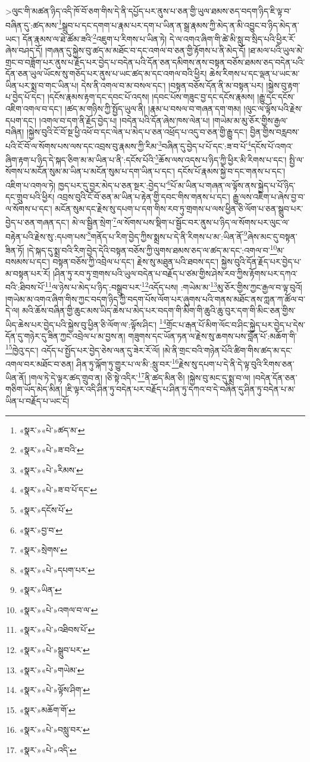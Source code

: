  >ལུང་གི་མཚན་ཉིད་འདི་ཁོ་བོ་ཅག་གིས་དེ་ནི་དཔྱོད་པར་ནུས་པ་ཅན་གྱི་ཡུལ་ཐམས་ཅད་བདག་ཉིད་ཇི་ལྟ་བ་བཞིན་དུ་:ཚད་མས་\footnote{«སྣར་»«པེ་»ཚད་མ་}སྒྲུབ་པ་དང་དགག་པ་རྣམ་པར་དག་པ་ཡིན་ན་སྒྲ་རྣམས་ཀྱི་མེད་ན་མི་འབྱུང་བ་ཉིད་མེད་ན་ཡང་། དོན་རྣམས་ལ་ཐེ་ཚོམ་ཟའི་\footnote{«སྣར་»«པེ་»ཟ་བའི་}འཇུག་པ་རིགས་པ་ཡིན་ཏེ། དེ་ལ་འགའ་ཞིག་གི་ཚེ་མི་སླུ་བ་སྲིད་པའི་ཕྱིར་རོ་ཞེས་བཤད་དོ། །གཞན་དུ་སྐྱེས་བུ་ཚད་མ་མཐོང་བ་དང་འགལ་བ་ཅན་གྱི་རྟོགས་པ་ནི་མེད་དོ། །ཐ་མལ་པའི་ཡུལ་མེ་གྲང་བ་བཟློག་པར་ནུས་པ་རྗོད་པར་བྱེད་པ་བདེན་པའི་དོན་ཅན་དམིགས་ནས་བསྟན་བཅོས་ཐམས་ཅད་བདེན་པའི་དོན་ཅན་ཡུལ་ཡོངས་སུ་གཅོད་པར་ནུས་པ་ཡང་ཚད་མ་དང་འགལ་བའི་ཕྱིར། ཆེས་རིགས་པ་དང་ལྡན་པ་ཡང་མ་ཡིན་པར་སྨྲ་བ་གང་ཡིན་པ། དེས་ནི་འགལ་བ་མ་བསལ་དང་། །བསྟན་བཅོས་དོན་ནི་མ་བསྟན་པར། །སྐྱེས་བུ་རྟག་པ་བྱེད་པོ་དང་། །དངོས་རྣམས་རྟག་དང་དབང་པོ་འདས། །དབང་པོས་གཟུང་བྱ་དང་དངོས་རྣམས། །རྒྱུ་དང་དངོས་འཇིག་འགལ་བ་དང་། །ཚད་མ་གཉིས་ཀྱི་སྤྱོད་ཡུལ་ནི། །རྣམ་པ་བསལ་བ་གཞན་དག་གམ། །ལུང་ལ་ལྟོས་པའི་རྗེས་དཔག་དང་། །འགལ་བ་དག་ནི་རྗོད་བྱེད་པ། །བདེན་པའི་དོན་ཞེས་ཁས་ལེན་པ། །གཡེམ་མ་མུ་ཅོར་གྱིས་རྒྱལ་བཞིན། །སྐྱེས་བུའི་ངོ་བོ་སྔ་ཕྱི་འཕོ་བ་དང་ལེན་པ་མེད་པ་ཅན་འཕྲོད་པ་འདུ་བ་ཅན་གྱི་རྒྱུ་དང་། བྱིན་གྱིས་བརླབས་པའི་ངོ་བོ་ལ་སོགས་པས་ལས་དང་འབྲས་བུ་རྣམས་ཀྱི་རིམ་\footnote{«སྣར་»«པེ་»རིམས་}བཞིན་དུ་བྱེད་པ་པོ་དང་:ཟ་བ་པོ་\footnote{«སྣར་»«པེ་»ཟ་བ་པོ་དང་}དངོས་པོ་འགའ་ཞིག་རྟག་པ་ཉིད་དེ་སྐད་ཅིག་མ་མ་ཡིན་པ་ནི་:དངོས་པོའི་\footnote{«སྣར་»དངོས་པོ་}ཆོས་ལས་འདས་པ་ཉིད་ཀྱི་ཕྱིར་མི་རིགས་པ་དང་། སྤྱི་ལ་སོགས་པ་མངོན་སུམ་མ་ཡིན་པ་མངོན་སུམ་པ་དག་ཡིན་པ་དང་། དངོས་པོ་རྣམས་སྐྱེ་བ་དང་གནས་པ་དང་། འཇིག་པ་འགལ་ཏེ། ཁྱད་པར་དུ་བྱར་མེད་པ་ཅན་སྔར་:བྱེད་པ་\footnote{«སྣར་»བྱ་བ་}པོ་མ་ཡིན་པ་གཞན་ལ་ལྟོས་ནས་སྐྱེད་པ་པོ་ཉིད་དང་གྲུབ་པའི་ཕྱིར། འབྲས་བུའི་ངོ་བོ་ཅན་མ་ཡིན་པ་རྟེན་གྱི་དབང་གིས་གནས་པ་དང་། རྒྱུ་ལས་འཇིག་པ་ཞེས་བྱ་བ་ལ་སོགས་པ་དང་། མངོན་སུམ་དང་རྗེས་སུ་དཔག་པ་དག་གིས་རབ་ཏུ་གྲགས་པ་ལས་ཕྱིན་ཅི་ལོག་པ་ཅན་སྒྲུབ་པར་བྱེད་པ་ཅན་གཞན་དང་། མེ་ལ་སྦྱིན་སྲེག་\footnote{«སྣར་»སྲེགས་}ལ་སོགས་པས་སྡིག་པ་སྦྱོང་བར་ནུས་པ་ཉིད་ལ་སོགས་པར་ལུང་ལ་བརྟེན་པའི་རྗེས་སུ་:དཔག་པས་\footnote{«སྣར་»«པེ་»དཔག་པར་}གནོད་པ་རིག་བྱེད་ཀྱིས་སྨྲས་པ་དེ་ནི་རིགས་པ་མ་:ཡིན་ནོ་\footnote{«སྣར་»ཡིན་}ཞེས་མང་དུ་བསྟན་ཟིན་ཏོ། །དེ་སྐད་དུ་སྨྲ་བའི་རིག་བྱེད་དེའི་བསྟན་བཅོས་ཀྱི་ལུགས་ཐམས་ཅད་ལ་ཚད་མ་དང་:འགལ་བ་\footnote{«སྣར་»«པེ་»འགལ་བ་ལ་}མ་བསམས་པ་དང་། བསྟན་བཅོས་ཀྱི་འབྲེལ་པ་དང་། རྗེས་སུ་མཐུན་པའི་ཐབས་དང་། སྐྱེས་བུའི་དོན་རྗོད་པར་བྱེད་པ་མ་བསྟན་པར་རོ། །ཤིན་ཏུ་རབ་ཏུ་གྲགས་པའི་ཡུལ་བདེན་པ་བརྗོད་པ་ཙམ་གྱིས་ཤེས་རབ་ཀྱིས་རྟོགས་པར་དཀའ་བའི་:ཐིབས་པོ་\footnote{«སྣར་»«པེ་»འཐིབས་པོ་}ལ་ཉེས་པ་མེད་པ་ཉིད་:བསྒྲུབ་པར་\footnote{«སྣར་»«པེ་»སྒྲུབ་པར་}འདོད་པས། :གཡེམ་མ་\footnote{«སྣར་»«པེ་»གཡེམ་}མུ་ཅོར་གྱིས་ཀྱང་རྒྱལ་བ་ལྟ་བུའོ། །གཡེམ་མ་འགའ་ཞིག་གིས་ཀྱང་བདག་ཉིད་ཀྱི་བདག་པོས་ལོག་པར་ཞུགས་པའི་གནས་མཐོང་ནས་ཀླན་ཀ་ཚོལ་བ་དེ་ལ། མའི་ཆོས་བཞིན་གྱི་ཆུང་མས་ཡིད་ཆེས་པ་མེད་པར་བདག་གི་མིག་གི་ཆུའི་ཆུ་བུར་དག་གི་མིང་ཅན་གྱིས་ཡིད་ཆེས་པར་བྱེད་པའི་སྐྱེས་བུ་ཕྱིན་ཅི་ལོག་ལ་:ལྟོས་ཤིང་། \footnote{«སྣར་»«པེ་»ལྟོས་ཤིག་}གྲོང་པ་རྒན་པོ་མིག་ལོང་བ་ཤིང་སྐྱེད་པར་བྱེད་པ་དེས་དོན་དུ་གཉེར་དུ་ཟིན་ཀྱང་འབྲེལ་པ་མ་བྱས་ན། གཟུགས་དང་ཡོན་ཏན་ལ་རྗེས་སུ་ཆགས་པས་བློན་པོ་:མཆོག་གི་\footnote{«སྣར་»མཆོག་གོ་}ཁྱེའུ་དང་། འདོད་པ་སྤྱོད་པར་བྱེད་ཅེས་ལན་དུ་ཟེར་རོ་ལོ། །མེ་ནི་གྲང་བའི་གཉེན་པོའི་ཚིག་གིས་ཚད་མ་དང་འགལ་བར་མཐོང་བ་ཅན། ཤིན་ཏུ་ལྐོག་ཏུ་གྱུར་པ་ལ་མི་:སླུ་བར་\footnote{«སྣར་»«པེ་»བསླུ་བར་}རྗེས་སུ་དཔག་པ་དེ་ནི་དེ་ལྟ་བུའི་རིགས་ཅན་ཡིན་ནོ། །གལ་ཏེ་དེ་ལྟར་ཚད་གྲུབ་ན། །ཅི་སྟེ་འདིར་\footnote{«སྣར་»«པེ་»འདི་}ནི་ཚད་མིན་ཅི། །སྐྱེས་བུ་མང་དུ་སྨྲ་བ་ལ། །བདེན་དོན་ཅན་གཅིག་ཡོད་མེད་མིན། །ཇི་ལྟར་འདི་ཤིན་ཏུ་བདེན་པར་བརྗོད་པ་ཤིན་ཏུ་དཀའ་བ་དེ་བཞིན་དུ་ཤིན་ཏུ་བདེན་པ་མ་ཡིན་པ་བརྗོད་པ་ཡང་ངོ། 